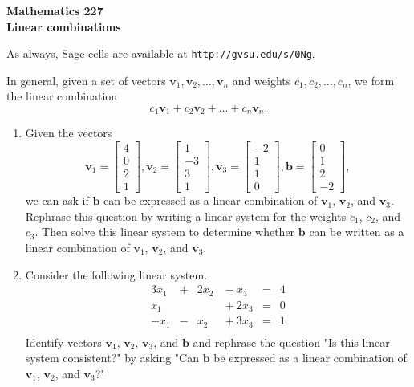 \documentclass[12pt]{article}
\newcommand{\vs}[1]{\vspace{#1in}}
\newcommand{\bvec}{{\mathbf b}}
\newcommand{\vvec}{{\mathbf v}}
\begin{document}
\noindent
{\bf Mathematics 227} \\ 
{\bf Linear combinations}

\bigskip
As always, Sage cells are available at {\tt http://gvsu.edu/s/0Ng}.

\medskip
In general, given a set of vectors
$\vvec_1,\vvec_2,\ldots,\vvec_n$ and weights $c_1,c_2,\ldots,c_n$, we
form the linear combination
$$
c_1\vvec_1 + c_2\vvec_2 + \ldots + c_n\vvec_n.
$$

\begin{enumerate}
\item Given the vectors
  $$
  \vvec_1 =
  \left[
    \begin{array}{r} 4 \\ 0 \\ 2 \\ 1 \end{array}
  \right], 
  \vvec_2 =
  \left[
    \begin{array}{r} 1 \\ -3 \\ 3 \\ 1 \end{array}
  \right], 
  \vvec_3 =
  \left[\begin{array}{r} -2 \\ 1 \\ 1 \\ 0 \end{array}
  \right], 
  \bvec  = \left[\begin{array}{r} 0 \\ 1 \\ 2 \\ -2 \end{array}
  \right],
  $$
  we can ask if $\bvec$ can be expressed as a linear combination of
  $\vvec_1$, $\vvec_2$, and $\vvec_3$.  Rephrase this question by
  writing a linear system for the weights $c_1$, $c_2$, and $c_3$.
  Then solve this linear system to determine whether $\bvec$ can be
  written as a linear combination of $\vvec_1$, $\vvec_2$, and
  $\vvec_3$.

  \vs{2}
\newpage
\item Consider the following linear system.
  $$
  \begin{alignedat}{4}
    3x_1 & {}+{} & 2x_2 & {}-{} x_3 & {}={} & 4 \\
    x_1 & & & {}+{} 2x_3 & {}={} & 0 \\
    -x_1 & {}-{} & x_2 & {}+{} 3x_3 & {}={} & 1
    \\
  \end{alignedat}
  $$
  Identify vectors $\vvec_1$, $\vvec_2$,
  $\vvec_3$, and $\bvec$ and 
  rephrase the question "Is this linear system consistent?" by
  asking "Can $\bvec$ be expressed as a linear combination
  of $\vvec_1$, $\vvec_2$, and $\vvec_3$?"


\end{enumerate}
\end{document}
